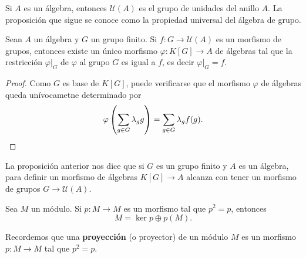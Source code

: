 Si $A$ es un álgebra, entonces $\mathcal{U}(A)$ es el grupo de unidades del anillo $A$. 
La proposición que sigue se conoce como la propiedad universal del álgebra de grupo.

\begin{proposition}
Sean $A$ un álgebra y $G$ un grupo finito. Si $f\colon G\to\mathcal{U}(A)$ es un morfismo de grupos, entonces
existe un único morfismo $\varphi\colon K[G]\to A$ de álgebras tal que la restricción
$\varphi|_G$ de $\varphi$ al grupo $G$ es igual a $f$, es decir 	$\varphi|_G=f$. 
\end{proposition}

\begin{proof}
Como $G$ es base de $K[G]$, puede verificarse que 
el morfismo $\varphi$ de álgebras 
queda unívocametne determinado por 
\[
\varphi\left(\sum_{g\in G}\lambda_gg\right)=\sum_{g\in G}\lambda_gf(g).\qedhere
\]	
\end{proof}

La proposición anterior nos dice que si $G$ es un grupo finito y $A$ es un álgebra, 
para definir un morfismo de álgebras $K[G]\to A$ 
alcanza con tener un morfismo de grupos $G\to\mathcal{U}(A)$.  

\begin{exercise}
Sea $M$ un módulo. 
Si $p\colon M\to M$ es un morfismo tal que $p^2=p$, entonces 
\[
M=\ker p\oplus p(M).
\]
\end{exercise}


Recordemos que 
una \textbf{proyección} (o proyector) de un módulo $M$ es un   
morfismo $p\colon M\to M$ tal que $p^2=p$. 
 

